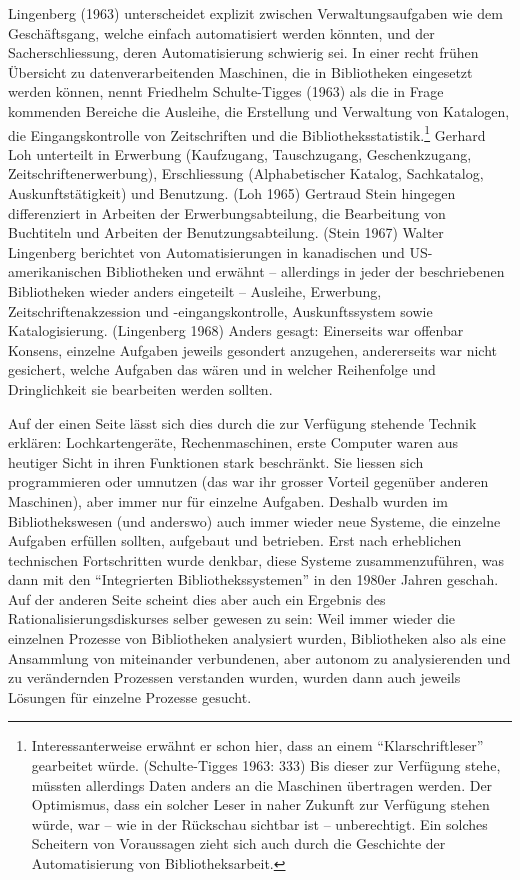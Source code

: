 \documentclass[a4paper,
fontsize=11pt,
oneside,
numbers=noperiodatend,
parskip=half-,
bibliography=totoc,
final
]{scrartcl}
\begin{document}
Lingenberg (1963) unterscheidet explizit zwischen Verwaltungsaufgaben
wie dem Geschäftsgang, welche einfach automatisiert werden könnten, und
der Sacherschliessung, deren Automatisierung schwierig sei. In einer
recht frühen Übersicht zu datenverarbeitenden Maschinen, die in
Bibliotheken eingesetzt werden können, nennt Friedhelm Schulte-Tigges
(1963) als die in Frage kommenden Bereiche die Ausleihe, die Erstellung
und Verwaltung von Katalogen, die Eingangskontrolle von Zeitschriften
und die Bibliotheksstatistik.\footnote{Interessanterweise erwähnt er
  schon hier, dass an einem \enquote{Klarschriftleser} gearbeitet würde.
  (Schulte-Tigges 1963: 333) Bis dieser zur Verfügung stehe, müssten
  allerdings Daten anders an die Maschinen übertragen werden. Der
  Optimismus, dass ein solcher Leser in naher Zukunft zur Verfügung
  stehen würde, war -- wie in der Rückschau sichtbar ist --
  unberechtigt. Ein solches Scheitern von Voraussagen zieht sich auch
  durch die Geschichte der Automatisierung von Bibliotheksarbeit.}
Gerhard Loh unterteilt in Erwerbung (Kaufzugang, Tauschzugang,
Geschenkzugang, Zeitschriftenerwerbung), Erschliessung (Alphabetischer
Katalog, Sachkatalog, Auskunftstätigkeit) und Benutzung. (Loh 1965)
Gertraud Stein hingegen differenziert in Arbeiten der
Erwerbungsabteilung, die Bearbeitung von Buchtiteln und Arbeiten der
Benutzungsabteilung. (Stein 1967) Walter Lingenberg berichtet von
Automatisierungen in kanadischen und US-amerikanischen Bibliotheken und
erwähnt -- allerdings in jeder der beschriebenen Bibliotheken wieder
anders eingeteilt -- Ausleihe, Erwerbung, Zeitschriftenakzession und
-eingangskontrolle, Auskunftssystem sowie Katalogisierung. (Lingenberg
1968) Anders gesagt: Einerseits war offenbar Konsens, einzelne Aufgaben
jeweils gesondert anzugehen, andererseits war nicht gesichert, welche
Aufgaben das wären und in welcher Reihenfolge und Dringlichkeit sie
bearbeiten werden sollten.

Auf der einen Seite lässt sich dies durch die zur Verfügung stehende
Technik erklären: Lochkartengeräte, Rechenmaschinen, erste Computer
waren aus heutiger Sicht in ihren Funktionen stark beschränkt. Sie
liessen sich programmieren oder umnutzen (das war ihr grosser Vorteil
gegenüber anderen Maschinen), aber immer nur für einzelne Aufgaben.
Deshalb wurden im Bibliothekswesen (und anderswo) auch immer wieder neue
Systeme, die einzelne Aufgaben erfüllen sollten, aufgebaut und
betrieben. Erst nach erheblichen technischen Fortschritten wurde
denkbar, diese Systeme zusammenzuführen, was dann mit den \enquote{Integrierten
Bibliothekssystemen} in den 1980er Jahren geschah. Auf der anderen Seite
scheint dies aber auch ein Ergebnis des Rationalisierungsdiskurses
selber gewesen zu sein: Weil immer wieder die einzelnen Prozesse von
Bibliotheken analysiert wurden, Bibliotheken also als eine Ansammlung
von miteinander verbundenen, aber autonom zu analysierenden und zu
verändernden Prozessen verstanden wurden, wurden dann auch jeweils
Lösungen für einzelne Prozesse gesucht.
\end{document}

